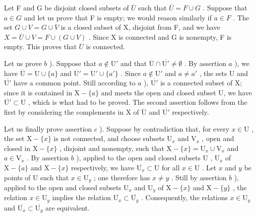 Let F and G be disjoint closed subsets of \(\overline{U}\) such that \(\overline{U} = F \cup G\) . Suppose that \(a \in G\) and let us prove that F is empty; we would reason similarly if \(a \in F\) . The set \(G \cup V = G \cup \overline{V}\) is a closed subset of X, disjoint from F, and we have \(X = \overline{U} \cup V = F \cup (G \cup V)\) . Since X is connected and G is nonempty, F is empty. This proves that \(\overline{U}\) is connected.

Let us prove \(b\) ). Suppose that \(a \notin \mathrm{U}'\) and that \(\overline{\mathrm{U}} \cap \overline{\mathrm{U}'} \neq \emptyset\) . By assertion \(a\) ), we have \(\overline{\mathrm{U}} = \mathrm{U} \cup \{a\}\) and \(\overline{\mathrm{U}'} = \mathrm{U}' \cup \{a'\}\) . Since \(a \notin \mathrm{U}'\) and \(a \neq a'\) , the sets U and \(\overline{\mathrm{U}'}\) have a common point. Still according to \(a\) ), \(\overline{\mathrm{U}'}\) is a connected subset of X; since it is contained in \(\mathrm{X} - \{a\}\) and meets the open and closed subset U, we have \(\overline{\mathrm{U}'} \subset \mathrm{U}\) , which is what had to be proved. The second assertion follows from the first by considering the complements in X of \(\overline{\mathrm{U}}\) and \(\overline{\mathrm{U}'}\) respectively.

Let us finally prove assertion \(c\) ). Suppose by contradiction that, for every \(x \in \mathrm{U}\) , the set \(\mathrm{X} - \{x\}\) is not connected, and choose subsets \(\mathrm{U}_x\) and \(\mathrm{V}_x\) , open and closed in \(\mathrm{X} - \{x\}\) , disjoint and nonempty, such that \(\mathrm{X} - \{x\} = \mathrm{U}_x \cup \mathrm{V}_x\) and \(a \in \mathrm{V}_x\) . By assertion \(b\) ), applied to the open and closed subsets \(\mathrm{U}\) , \(\mathrm{U}_x\) of \(\mathrm{X} - \{a\}\) and \(\mathrm{X} - \{x\}\) respectively, we have \(\overline{\mathrm{U}_x} \subset \mathrm{U}\) for all \(x \in \mathrm{U}\) . Let \(x\) and \(y\) be points of U such that \(x \in \mathrm{U}_y\) ; one therefore has \(x \neq y\) . Still by assertion \(b\) ), applied to the open and closed subsets \(\mathrm{U}_x\) and \(\mathrm{U}_y\) of \(\mathrm{X} - \{x\}\) and \(\mathrm{X} - \{y\}\) , the relation \(x \in \mathrm{U}_y\) implies the relation \(\overline{\mathrm{U}_x} \subset \overline{\mathrm{U}_y}\) . Consequently, the relations \(x \in \mathrm{U}_y\) and \(\overline{\mathrm{U}_x} \subset \overline{\mathrm{U}_y}\) are equivalent.

